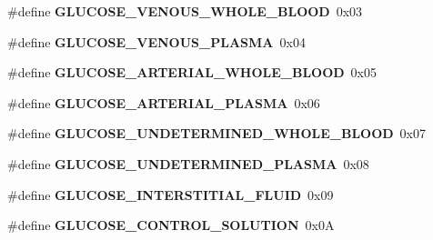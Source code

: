 \begin{DoxyCompactItemize}
\item 
\#define {\bfseries G\+L\+U\+C\+O\+S\+E\+\_\+\+V\+E\+N\+O\+U\+S\+\_\+\+W\+H\+O\+L\+E\+\_\+\+B\+L\+O\+OD}~0x03\hypertarget{group___b_l_e___g_s_ga0261c771d02f6bf27dd088e774fc8eca}{}\label{group___b_l_e___g_s_ga0261c771d02f6bf27dd088e774fc8eca}

\item 
\#define {\bfseries G\+L\+U\+C\+O\+S\+E\+\_\+\+V\+E\+N\+O\+U\+S\+\_\+\+P\+L\+A\+S\+MA}~0x04\hypertarget{group___b_l_e___g_s_gaf408f3eff39733602a8a4ed6a0ab5c86}{}\label{group___b_l_e___g_s_gaf408f3eff39733602a8a4ed6a0ab5c86}

\item 
\#define {\bfseries G\+L\+U\+C\+O\+S\+E\+\_\+\+A\+R\+T\+E\+R\+I\+A\+L\+\_\+\+W\+H\+O\+L\+E\+\_\+\+B\+L\+O\+OD}~0x05\hypertarget{group___b_l_e___g_s_ga28ef0d6bfcd85bdb517f29da94bf6bd6}{}\label{group___b_l_e___g_s_ga28ef0d6bfcd85bdb517f29da94bf6bd6}

\item 
\#define {\bfseries G\+L\+U\+C\+O\+S\+E\+\_\+\+A\+R\+T\+E\+R\+I\+A\+L\+\_\+\+P\+L\+A\+S\+MA}~0x06\hypertarget{group___b_l_e___g_s_ga49d50467164a51793bdb81495897e9c8}{}\label{group___b_l_e___g_s_ga49d50467164a51793bdb81495897e9c8}

\item 
\#define {\bfseries G\+L\+U\+C\+O\+S\+E\+\_\+\+U\+N\+D\+E\+T\+E\+R\+M\+I\+N\+E\+D\+\_\+\+W\+H\+O\+L\+E\+\_\+\+B\+L\+O\+OD}~0x07\hypertarget{group___b_l_e___g_s_ga442ca60a9c2b868f29d113b18d1b35d3}{}\label{group___b_l_e___g_s_ga442ca60a9c2b868f29d113b18d1b35d3}

\item 
\#define {\bfseries G\+L\+U\+C\+O\+S\+E\+\_\+\+U\+N\+D\+E\+T\+E\+R\+M\+I\+N\+E\+D\+\_\+\+P\+L\+A\+S\+MA}~0x08\hypertarget{group___b_l_e___g_s_gad5eb58a46e83a9a49c66d4df55bd7e83}{}\label{group___b_l_e___g_s_gad5eb58a46e83a9a49c66d4df55bd7e83}

\item 
\#define {\bfseries G\+L\+U\+C\+O\+S\+E\+\_\+\+I\+N\+T\+E\+R\+S\+T\+I\+T\+I\+A\+L\+\_\+\+F\+L\+U\+ID}~0x09\hypertarget{group___b_l_e___g_s_ga2e863bef9c0868c10315d6175b6bbea2}{}\label{group___b_l_e___g_s_ga2e863bef9c0868c10315d6175b6bbea2}

\item 
\#define {\bfseries G\+L\+U\+C\+O\+S\+E\+\_\+\+C\+O\+N\+T\+R\+O\+L\+\_\+\+S\+O\+L\+U\+T\+I\+ON}~0x0A\hypertarget{group___b_l_e___g_s_ga9b54ae7b2b37493b170322b4bd360f0d}{}\label{group___b_l_e___g_s_ga9b54ae7b2b37493b170322b4bd360f0d}


\end{DoxyCompactItemize}
